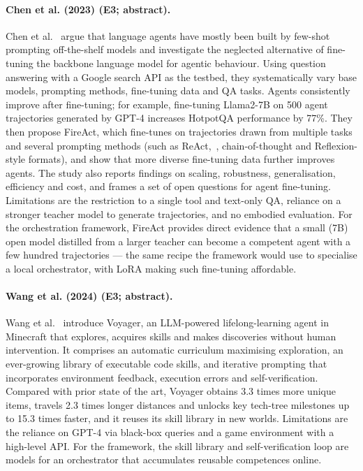 \documentclass[10pt,a4paper]{article}
\begin{document}
\paragraph{Chen et al. (2023) (E3; abstract).} Chen et al.~\cite{Chen2023b} argue that language agents have mostly been built by few-shot prompting off-the-shelf models and investigate the neglected alternative of fine-tuning the backbone language model for agentic behaviour. Using question answering with a Google search API as the testbed, they systematically vary base models, prompting methods, fine-tuning data and QA tasks. Agents consistently improve after fine-tuning; for example, fine-tuning Llama2-7B on 500 agent trajectories generated by GPT-4 increases HotpotQA performance by 77\%. They then propose FireAct, which fine-tunes on trajectories drawn from multiple tasks and several prompting methods (such as ReAct,~\cite{Yao2023a}, chain-of-thought and Reflexion-style formats), and show that more diverse fine-tuning data further improves agents. The study also reports findings on scaling, robustness, generalisation, efficiency and cost, and frames a set of open questions for agent fine-tuning. Limitations are the restriction to a single tool and text-only QA, reliance on a stronger teacher model to generate trajectories, and no embodied evaluation. For the orchestration framework, FireAct provides direct evidence that a small (7B) open model distilled from a larger teacher can become a competent agent with a few hundred trajectories --- the same recipe the framework would use to specialise a local orchestrator, with LoRA making such fine-tuning affordable.

\paragraph{Wang et al. (2024) (E3; abstract).} Wang et al.~\cite{Wang2024a} introduce Voyager, an LLM-powered lifelong-learning agent in Minecraft that explores, acquires skills and makes discoveries without human intervention. It comprises an automatic curriculum maximising exploration, an ever-growing library of executable code skills, and iterative prompting that incorporates environment feedback, execution errors and self-verification. Compared with prior state of the art, Voyager obtains 3.3 times more unique items, travels 2.3 times longer distances and unlocks key tech-tree milestones up to 15.3 times faster, and it reuses its skill library in new worlds. Limitations are the reliance on GPT-4 via black-box queries and a game environment with a high-level API. For the framework, the skill library and self-verification loop are models for an orchestrator that accumulates reusable competences online.
\end{document}
